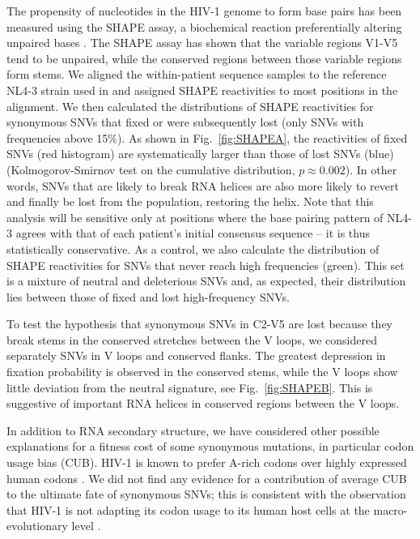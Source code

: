 \documentclass[rmp, twocolumn]{revtex4}
\newcommand{\FIG}[1]{Fig.~\ref{fig:#1}}
\newcommand{\shankaregion}{C2-V5}
\begin{document}
The propensity of nucleotides in the HIV-1 genome to form base pairs has been
measured using the SHAPE assay, a biochemical reaction preferentially altering
unpaired bases 
\citep{watts_architecture_2009}. The SHAPE assay has shown that the variable
regions V1-V5 tend to be unpaired, while the conserved regions between those
variable regions form stems. We aligned the within-patient sequence samples to
the reference NL4-3 strain used in \citet{watts_architecture_2009} and assigned
SHAPE reactivities to most positions in the alignment. We then calculated the
distributions of SHAPE reactivities for synonymous SNVs that fixed or were
subsequently lost (only SNVs with frequencies above 15\%). As shown in
\FIG{SHAPEA}, the reactivities of fixed SNVs (red histogram) are systematically
larger than those of lost SNVs (blue) (Kolmogorov-Smirnov test on the cumulative
distribution, $p\approx 0.002$). In other words, SNVs that are likely to
break RNA helices are also more likely to revert and finally be lost from the
population, restoring the helix. Note that this analysis will be sensitive only
at positions where the base pairing pattern of NL4-3 agrees with that of each
patient's initial consensus sequence -- it is thus statistically conservative.
As a control, we also calculate the distribution of SHAPE reactivities for SNVs
that never reach high frequencies (green). This set is a mixture of neutral and
deleterious SNVs and, as expected, their distribution lies between those of
fixed and lost high-frequency SNVs.

To test the hypothesis that synonymous SNVs in \shankaregion{} are lost because they
break stems in the conserved stretches between the V loops, we considered
separately SNVs in V loops and conserved flanks. The greatest
depression in fixation probability is observed in the conserved stems, while the
V loops show little deviation from the neutral signature, see
\FIG{SHAPEB}. This is suggestive of important RNA helices in conserved
regions between the V loops.

In addition to RNA secondary structure, we have considered other possible
explanations for a fitness cost of some synonymous mutations, in particular
codon usage bias (CUB). HIV-1 is known to prefer A-rich codons over highly
expressed human codons \citep{jenkins_extent_2003, kuyl_biased_2012}. We
did not find any evidence for a contribution of average CUB to the ultimate
fate of synonymous SNVs; this is consistent with the observation that HIV-1 is not
adapting its codon usage to its human host cells at the macro-evolutionary level
\citep{kuyl_biased_2012}.
\end{document}
